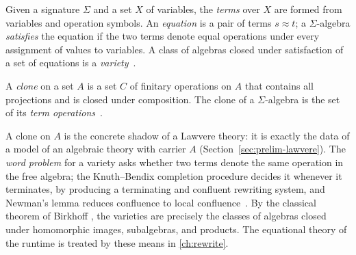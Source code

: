 \begin{definition}
Given a signature $\Sigma$ and a set $X$ of variables, the \emph{terms} over
$X$ are formed from variables and operation symbols. An \emph{equation} is a
pair of terms $s \approx t$; a $\Sigma$-algebra \emph{satisfies} the equation
if the two terms denote equal operations under every assignment of values to
variables. A class of algebras closed under satisfaction of a set of
equations is a \emph{variety}~\cite{lawvere, knuthbendix}.
\end{definition}

\begin{definition}[Clone]
A \emph{clone} on a set $A$ is a set $C$ of finitary operations on $A$ that
contains all projections and is closed under composition. The clone of a
$\Sigma$-algebra is the set of its \emph{term operations}~\cite{lawvere}.
\end{definition}

\begin{remark}
A clone on $A$ is the concrete shadow of a Lawvere theory: it is exactly the
data of a model of an algebraic theory with carrier $A$
(Section~\ref{sec:prelim-lawvere}). The \emph{word problem} for a variety
asks whether two terms denote the same operation in the free algebra; the
Knuth--Bendix completion procedure decides it whenever it terminates, by
producing a terminating and confluent rewriting system, and Newman's lemma
reduces confluence to local confluence~\cite{knuthbendix, newman,
arxiv-rewriting-kb}. By the classical theorem of Birkhoff \citep{birkhoff}, the varieties are
precisely the classes of algebras closed under homomorphic images,
subalgebras, and products. The equational theory of the runtime is treated by
these means in \autoref{ch:rewrite}.
\end{remark}

